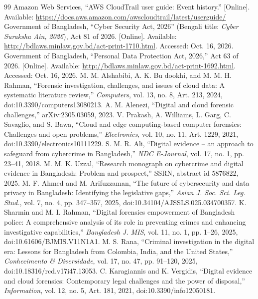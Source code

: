 \documentclass[conference]{IEEEtran}
\begin{document}
\begin{thebibliography}{99}
 Amazon Web Services, ``AWS CloudTrail user guide: Event history.'' [Online]. Available: \url{https://docs.aws.amazon.com/awscloudtrail/latest/userguide/}
 Government of Bangladesh, ``Cyber Security Act, 2026'' (Bengali title: \textit{Cyber Suraksha Ain, 2026}), Act 81 of 2026. [Online]. Available: \url{http://bdlaws.minlaw.gov.bd/act-print-1710.html}. Accessed: Oct. 16, 2026.
 Government of Bangladesh, ``Personal Data Protection Act, 2026,'' Act 63 of 2026. [Online]. Available: \url{http://bdlaws.minlaw.gov.bd/act-print-1692.html}. Accessed: Oct. 16, 2026.
 M. M. Alshabibi, A. K. Bu dookhi, and M. M. H. Rahman, ``Forensic investigation, challenges, and issues of cloud data: A systematic literature review,'' \textit{Computers}, vol. 13, no. 8, Art. 213, 2024, doi:10.3390/computers13080213.
 A. M. Alenezi, ``Digital and cloud forensic challenges,'' arXiv:2305.03059, 2023.
 V. Prakash, A. Williams, L. Garg, C. Savaglio, and S. Bawa, ``Cloud and edge computing-based computer forensics: Challenges and open problems,'' \textit{Electronics}, vol. 10, no. 11, Art. 1229, 2021, doi:10.3390/electronics10111229.
 S. M. R. Ali, ``Digital evidence -- an approach to safeguard from cybercrime in Bangladesh,'' \textit{NDC E-Journal}, vol. 17, no. 1, pp. 23--41, 2018.
 M. M. K. Uzzal, ``Research monograph on cybercrime and digital evidence in Bangladesh: Problem and prospect,'' SSRN, abstract id 5876822, 2025.
 M. F. Ahmed and M. Arifuzzaman, ``The future of cybersecurity and data privacy in Bangladesh: Identifying the legislative gaps,'' \textit{Asian J. Soc. Sci. Leg. Stud.}, vol. 7, no. 4, pp. 347--357, 2025, doi:10.34104/AJSSLS.025.034700357.
 K. Sharmin and M. I. Rahman, ``Digital forensics empowerment of Bangladesh police: A comprehensive analysis of its role in preventing crimes and enhancing investigative capabilities,'' \textit{Bangladesh J. MIS}, vol. 11, no. 1, pp. 1--26, 2025, doi:10.61606/BJMIS.V11N1A1.
 M. S. Rana, ``Criminal investigation in the digital era: Lessons for Bangladesh from Colombia, India, and the United States,'' \textit{Conhecimento \& Diversidade}, vol. 17, no. 47, pp. 91--120, 2025, doi:10.18316/rcd.v17i47.13053.
 C. Karagiannis and K. Vergidis, ``Digital evidence and cloud forensics: Contemporary legal challenges and the power of disposal,'' \textit{Information}, vol. 12, no. 5, Art. 181, 2021, doi:10.3390/info12050181.

\end{thebibliography}
\end{document}
